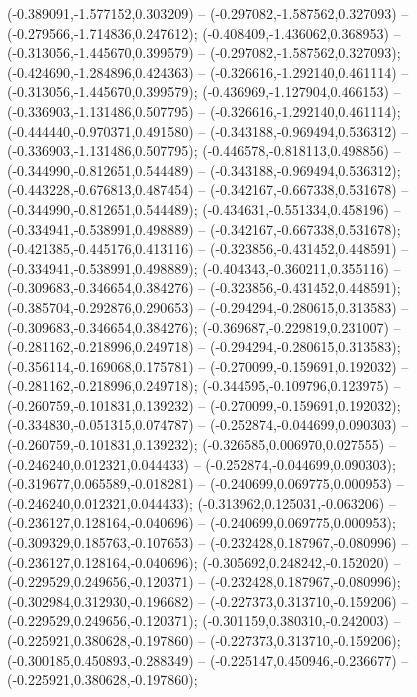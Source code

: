  (-0.389091,-1.577152,0.303209) -- (-0.297082,-1.587562,0.327093) -- (-0.279566,-1.714836,0.247612);
 (-0.408409,-1.436062,0.368953) -- (-0.313056,-1.445670,0.399579) -- (-0.297082,-1.587562,0.327093);
 (-0.424690,-1.284896,0.424363) -- (-0.326616,-1.292140,0.461114) -- (-0.313056,-1.445670,0.399579);
 (-0.436969,-1.127904,0.466153) -- (-0.336903,-1.131486,0.507795) -- (-0.326616,-1.292140,0.461114);
 (-0.444440,-0.970371,0.491580) -- (-0.343188,-0.969494,0.536312) -- (-0.336903,-1.131486,0.507795);
 (-0.446578,-0.818113,0.498856) -- (-0.344990,-0.812651,0.544489) -- (-0.343188,-0.969494,0.536312);
 (-0.443228,-0.676813,0.487454) -- (-0.342167,-0.667338,0.531678) -- (-0.344990,-0.812651,0.544489);
 (-0.434631,-0.551334,0.458196) -- (-0.334941,-0.538991,0.498889) -- (-0.342167,-0.667338,0.531678);
 (-0.421385,-0.445176,0.413116) -- (-0.323856,-0.431452,0.448591) -- (-0.334941,-0.538991,0.498889);
 (-0.404343,-0.360211,0.355116) -- (-0.309683,-0.346654,0.384276) -- (-0.323856,-0.431452,0.448591);
 (-0.385704,-0.292876,0.290653) -- (-0.294294,-0.280615,0.313583) -- (-0.309683,-0.346654,0.384276);
 (-0.369687,-0.229819,0.231007) -- (-0.281162,-0.218996,0.249718) -- (-0.294294,-0.280615,0.313583);
 (-0.356114,-0.169068,0.175781) -- (-0.270099,-0.159691,0.192032) -- (-0.281162,-0.218996,0.249718);
 (-0.344595,-0.109796,0.123975) -- (-0.260759,-0.101831,0.139232) -- (-0.270099,-0.159691,0.192032);
 (-0.334830,-0.051315,0.074787) -- (-0.252874,-0.044699,0.090303) -- (-0.260759,-0.101831,0.139232);
 (-0.326585,0.006970,0.027555) -- (-0.246240,0.012321,0.044433) -- (-0.252874,-0.044699,0.090303);
 (-0.319677,0.065589,-0.018281) -- (-0.240699,0.069775,0.000953) -- (-0.246240,0.012321,0.044433);
 (-0.313962,0.125031,-0.063206) -- (-0.236127,0.128164,-0.040696) -- (-0.240699,0.069775,0.000953);
 (-0.309329,0.185763,-0.107653) -- (-0.232428,0.187967,-0.080996) -- (-0.236127,0.128164,-0.040696);
 (-0.305692,0.248242,-0.152020) -- (-0.229529,0.249656,-0.120371) -- (-0.232428,0.187967,-0.080996);
 (-0.302984,0.312930,-0.196682) -- (-0.227373,0.313710,-0.159206) -- (-0.229529,0.249656,-0.120371);
 (-0.301159,0.380310,-0.242003) -- (-0.225921,0.380628,-0.197860) -- (-0.227373,0.313710,-0.159206);
 (-0.300185,0.450893,-0.288349) -- (-0.225147,0.450946,-0.236677) -- (-0.225921,0.380628,-0.197860);
